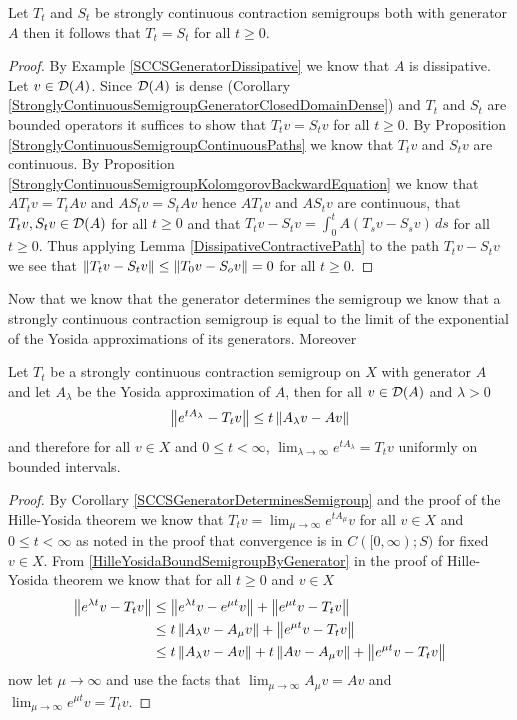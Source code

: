 \begin{cor}\label{SCCSGeneratorDeterminesSemigroup}Let $T_t$ and $S_t$ be strongly continuous contraction semigroups both with generator $A$ then it follows that $T_t=S_t$ for all $t \geq 0$.
\end{cor}
\begin{proof}
By Example \ref{SCCSGeneratorDissipative} we know that $A$ is dissipative.  Let $v \in \mathcal{D}(A)$.  Since $\mathcal{D}(A)$ is dense (Corollary \ref{StronglyContinuousSemigroupGeneratorClosedDomainDense}) and $T_t$ and $S_t$ are bounded operators it suffices to show that $T_t v = S_t v$ for all $t \geq 0$.  By Proposition \ref{StronglyContinuousSemigroupContinuousPaths} we know that $T_tv$ and $S_tv$ are continuous.  By Proposition \ref{StronglyContinuousSemigroupKolomgorovBackwardEquation} we know that $A T_t v = T_t Av$ and $A S_t v = S_t Av$ hence $A T_t v$ and $A S_t v$ are continuous, that $T_tv, S_tv \in \mathcal{D}(A)$ for all $t \geq 0$ and that $T_tv - S_tv = \int_0^t A (T_s v - S_s v) \, ds$ for all $t \geq 0$.  Thus applying Lemma \ref{DissipativeContractivePath} to the path
$T_t v - S_t v$ we see that $\left \lVert T_t v - S_t v \right \rVert \leq \left \lVert T_0 v - S_o v \right \rVert  = 0$ for all $t \geq 0$.  
\end{proof}

Now that we know that the generator determines the semigroup we know that a strongly continuous contraction semigroup is equal to the limit of the exponential of the Yosida approximations of its generators.  Moreover 
\begin{cor}\label{YosidaApproximationContinuity}Let $T_t$ be a strongly continuous contraction semigroup on $X$ with generator $A$  and let $A_\lambda$ be the Yosida approximation of $A$, then for all $v \in \mathcal{D}(A)$ and $\lambda > 0$ 
\begin{align*}
\left \lVert e^{tA_\lambda} - T_t v \right \rVert \leq t \left \lVert A_\lambda v - Av \right \rVert
\end{align*}
and therefore for all $v \in X$ and $0 \leq t < \infty$, $\lim_{\lambda \to \infty} e^{t A_\lambda} = T_t v$ uniformly on bounded intervals.
\end{cor}
\begin{proof}
By Corollary \ref{SCCSGeneratorDeterminesSemigroup} and the proof of the Hille-Yosida theorem we know that $T_t v = \lim_{\mu \to \infty} e^{t A_\mu} v$ for all $v \in X$ and $0 \leq t < \infty$ as noted in the proof that convergence is in $C([0,\infty); S)$ for fixed $v \in X$.  From \eqref{HilleYosidaBoundSemigroupByGenerator} in the proof of Hille-Yosida theorem we know that for all $t\geq 0$ and $v \in X$
\begin{align*}
\left \lVert e^{\lambda t}v  - T_tv \right \rVert &\leq \left \lVert e^{\lambda t}v  - e^{\mu t} v \right \rVert + \left \lVert e^{\mu t}v  - T_tv \right \rVert \\
&\leq t\left \lVert A_\lambda v - A_\mu v \right \rVert + \left \lVert e^{\mu t}v  - T_tv \right \rVert \\
&\leq t\left \lVert A_\lambda v - A v \right \rVert + t\left \lVert A v - A_\mu v \right \rVert + \left \lVert e^{\mu t}v  - T_tv \right \rVert \\
\end{align*}
now let $\mu \to \infty$ and use the facts that $\lim_{\mu \to \infty} A_\mu v = Av$ and $\lim_{\mu \to \infty} e^{\mu t}v  = T_tv$.  
\end{proof}

